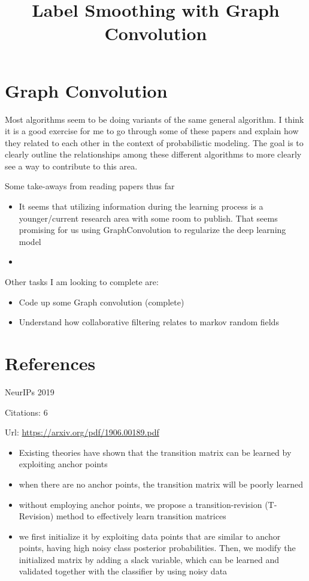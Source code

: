 \documentclass[11pt]{article}
\title{Label Smoothing with Graph Convolution}
\author{}
\date{}
\begin{document}
\maketitle

\section{Graph Convolution}

Most algorithms seem to be doing variants of the same general algorithm. I think it is a good exercise for me to go through some of these papers and explain how they related to each other in the context of probabilistic modeling. The goal is to clearly outline the relationships among these different algorithms to more clearly see a way to contribute to this area.

\vspace{2cm}
\noindent Some take-aways from reading papers thus far
\begin{itemize}
\item It seems that utilizing information during the learning process is a younger/current research area with some room to publish. That seems promising for us using GraphConvolution to regularize the deep learning model
\item 
\end{itemize}

\vspace{2cm}
\noindent Other tasks I am looking to complete are:
\begin{itemize}
\item Code up some Graph convolution (complete)
\item Understand how collaborative filtering relates to markov random fields
\end{itemize}

\newpage

\section{References}

\noindent NeurIPs 2019

\noindent Citations: 6

\noindent Url: \url{https://arxiv.org/pdf/1906.00189.pdf}

\begin{itemize}
   \item Existing theories have shown that the transition matrix can be learned by exploiting anchor points
   \item when there are no anchor points, the transition matrix will be poorly learned
   \item without employing anchor points, we propose a transition-revision (T-Revision) method to effectively learn transition matrices
   \item we first initialize it by exploiting data points that are similar to anchor points, having high noisy class posterior probabilities. Then, we modify the initialized matrix by adding a slack variable, which can be learned and validated together with the classifier by using noisy data
\end{itemize}
\end{document}
